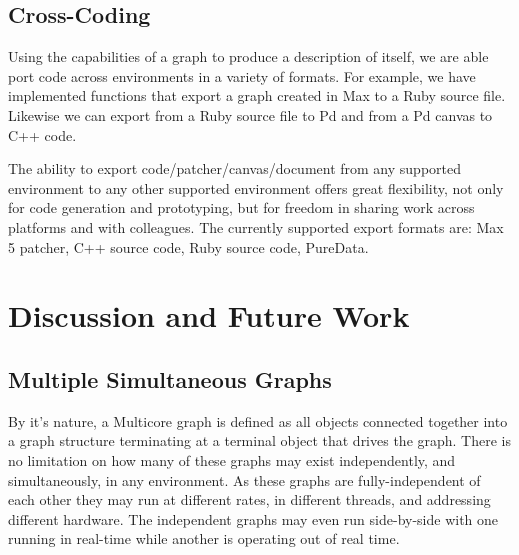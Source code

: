\documentclass[twoside,a4paper]{article}
\begin{document}


\subsection{Cross-Coding} %

Using the capabilities of a graph to produce a description of itself, we are able port code across environments in a variety of formats.  
For example, we have implemented functions that export a graph created in Max to a Ruby source file.  
Likewise we can export from a Ruby source file to Pd and from a Pd canvas to C++ code.  

The ability to export code/patcher/canvas/document from any supported environment to any other supported environment offers great flexibility, not only for code generation and prototyping, but for freedom in sharing work across platforms and with colleagues.  
The currently supported export formats are: Max 5 patcher, C++ source code, Ruby source code, PureData.






\section{Discussion and Future Work} %



\subsection{Multiple Simultaneous Graphs} %

By it's nature, a Multicore graph is defined as all objects connected together into a graph structure terminating at a terminal object that drives the graph.  
There is no limitation on how many of these graphs may exist independently, and simultaneously, in any environment.  
As these graphs are fully-independent of each other they may run at different rates, in different threads, and addressing different hardware.  The independent graphs may even run side-by-side with one running in real-time while another is operating out of real time.
\end{document}
